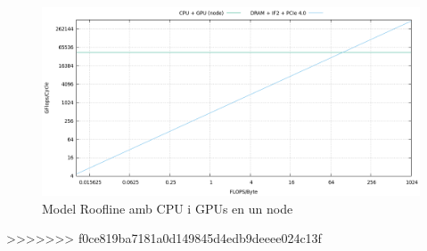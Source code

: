 \begin{figure}[H]
    \centering
    \includegraphics[width=\textwidth]{entregable/img/roofline_cpu_gpun}
    \caption{Model Roofline amb CPU i GPUs en un node}
    \label{fig:summary}
\end{figure}

%
>>>>>>> f0ce819ba7181a0d149845d4edb9deeee024c13f
